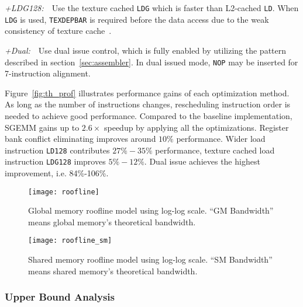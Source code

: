 {\it +LDG128:}~~Use the texture cached {\tt LDG} which is faster than L2-cached {\tt LD}. 
When {\tt LDG} is used, {\tt TEXDEPBAR} is required before the data access due to the weak consistency of texture cache~\cite{lukyanov2014efficient}.

{\it +Dual:}~~Use dual issue control, which is fully enabled by utilizing the pattern described in section~\ref{sec:assembler}.
In dual issued mode, {\tt NOP} may be inserted for 7-instruction alignment.

Figure~\ref{fig:th_prof} illustrates performance gains of each optimization method.
As long as the number of instructions changes, rescheduling instruction order is needed to achieve good performance.
Compared to the baseline implementation, SGEMM gains up to $2.6\times$ speedup by applying all the optimizations.
Register bank conflict eliminating improves around $10\%$ performance. 
Wider load instruction {\tt LD128} contributes $27\%-35\%$ performance, texture cached
load instruction {\tt LDG128} improves $5\%-12\%$.
Dual issue achieves the highest improvement, i.e. 84\%-106\%.


\begin{figure}[htbp]
\begin{center}
\texttt{[image: roofline]}
    \caption{Global memory roofline model using log-log scale. ``GM Bandwidth'' means global memory's theoretical
    bandwidth.} %
\label{fig:roofline_global}
\end{center}
\end{figure}

\begin{figure}[htbp]
\begin{center}
\texttt{[image: roofline\_sm]}
    \caption{Shared memory roofline model using log-log scale. ``SM Bandwidth'' means shared memory's theoretical
    bandwidth. }%
\label{fig:roofline_shared}
\end{center}
\end{figure}

\subsubsection{Upper Bound Analysis}


